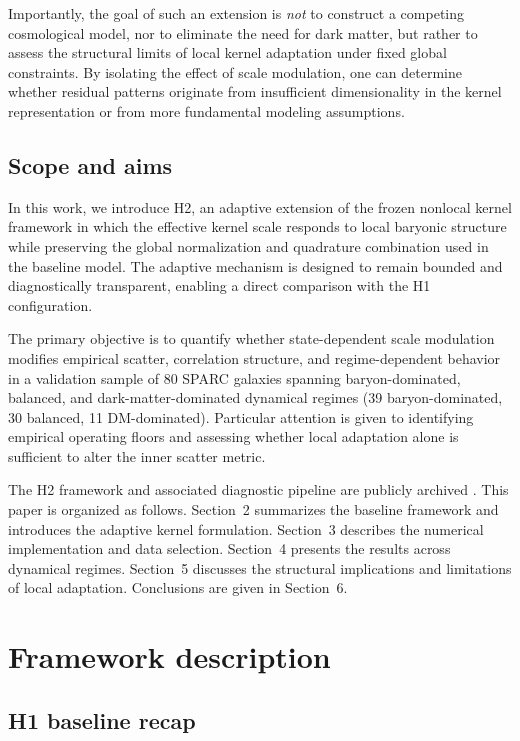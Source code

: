 \documentclass{aa}
\begin{document}
Importantly, the goal of such an extension is \emph{not} to construct a 
competing cosmological model, nor to eliminate the need for dark matter, 
but rather to assess the structural limits of local kernel adaptation under 
fixed global constraints. By isolating the effect of scale modulation, one 
can determine whether residual patterns originate from insufficient 
dimensionality in the kernel representation or from more fundamental 
modeling assumptions.

\subsection{Scope and aims}

In this work, we introduce H2, an adaptive extension of the frozen nonlocal 
kernel framework in which the effective kernel scale responds to local 
baryonic structure while preserving the global normalization and quadrature 
combination used in the baseline model. The adaptive mechanism is designed 
to remain bounded and diagnostically transparent, enabling a direct 
comparison with the H1 configuration.

The primary objective is to quantify whether state-dependent scale modulation
modifies empirical scatter, correlation structure, and regime-dependent
behavior in a validation sample of 80 SPARC galaxies spanning baryon-dominated,
balanced, and dark-matter-dominated dynamical regimes (39 baryon-dominated,
30 balanced, 11 DM-dominated). Particular attention is
given to identifying empirical operating floors and assessing whether local
adaptation alone is sufficient to alter the inner scatter metric.

The H2 framework and associated diagnostic pipeline are publicly archived 
\citep{h2model2026}. This paper is organized as follows. Section~2 
summarizes the baseline framework and introduces the adaptive kernel 
formulation. Section~3 describes the numerical implementation and data 
selection. Section~4 presents the results across dynamical regimes. 
Section~5 discusses the structural implications and limitations of local 
adaptation. Conclusions are given in Section~6.
\section{Framework description}

\subsection{H1 baseline recap}
\end{document}
